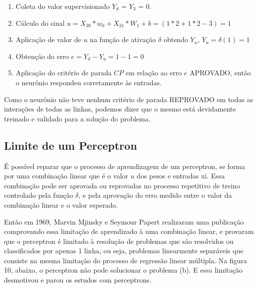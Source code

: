 \documentclass[	12pt, Times, openright, twoside, a4paper, english, brazil]{abntex2}
\begin{document}
            	\begin{enumerate}
            	    \item Coleta do valor supervisionado $Y_d$ = $Y_3$ = 0.
            		\item Cálculo do sinal $u = X_{30}*w_0 + X_{31}*W_1 +b  = (1*2 + 1*2 -3) = 1$
            		\item Aplicação de valor de $u$ na função de ativação $\delta$ obtendo $Y_u$, $Y_u = \delta(1) = 1$
            		\item Obtenção do erro $e = Y_d-Y_u = 1 - 1 = 0$
            		\item Aplicação do critério de parada $CP$ em relação ao erro $e$ APROVADO, então o neurônio respondeu corretamente às entradas.
            	\end{enumerate}
           
           		Como o neurônio não teve nenhum critério de parada REPROVADO em todas as interações de todas as linhas, podemos dizer que o mesmo está devidamente treinado e validado para a solução do problema.
            
        \subsection{Limite de um Perceptron}
          É possível reparar que o processo de aprendizagem de um perceptron, se forma por uma combinação linear que é o valor $ u $ dos pesos e entradas xi. Essa combinação pode ser aprovada ou reprovadas no processo repetitivo de treino controlado pela função $\delta$, e pela aprovação do erro medido entre o valor da combinação linear e o valor esperado.
          
          Então em 1969, Marvin Mjinsky e Seymour Papert realizaram uma publicação comprovando essa limitação de aprendizado à uma combinação linear, e provaram que o perceptron é limitado à resolução de problemas que são resolvidos ou classificados por apenas 1 linha, ou seja, problemas linearmente separáveis que consiste na mesma limitação do processo de regressão linear múltipla.
          Na figura 10, abaixo, o perceptron não pode solucionar o problema (b). E essa limitação desmotivou e parou os estudos com perceptrons.
    		  \begin{figure}[H]
    		  	
    		  \end{figure}
	  	
\end{document}
